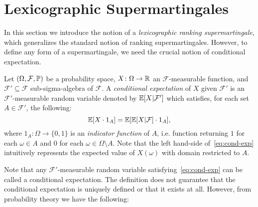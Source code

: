 \section{Lexicographic Supermartingales}
\label{sec:lexicographic}

In this section we introduce the notion of a \emph{lexicographic ranking 
supermartingale}, which generalizes the standard notion of ranking 
supermartingales. However, to define any form of a supermartingale, we need the crucial notion of conditional expectation.

\smallskip{} 
Let $(\Omega,\mathcal{F},\mathbb{P})$ be a probability space, 
$X\colon\Omega\rightarrow 
\mathbb{R}$ an $\mathcal{F}$-measurable function, and $\mathcal{F}'\subseteq 
\mathcal{F}$ sub-sigma-algebra of $\mathcal{F}$. A \emph{conditional 
	expectation} of $X$ given $\mathcal{F}'$ is an $\mathcal{F}'$-measurable random 
variable denoted by $\mathbb{E}[X| \mathcal{F}']$ which satisfies, for each set $A\in 
\mathcal{F}'$, the following: 
\begin{equation}
\label{eq:cond-exp}
\mathbb{E}[X\cdot 1_A] = \mathbb{E}[\mathbb{E}[X|\mathcal{F}]\cdot 1_A],
\end{equation}
where $1_A \colon \Omega\rightarrow \{0,1\}$ is an \emph{indicator function} of 
$A$, i.e. function returning $1$ for 
each $\omega\in A$ and $0$ for each $\omega\in \Omega\setminus A$. Note that 
the left hand-side of~\eqref{eq:cond-exp} intuitively represents the expected 
value 
of $X(\omega)$ with domain restricted to $A$.

Note that any $\mathcal{F}'$-measurable random variable satisfying~\eqref{eq:cond-exp} can be called a conditional expectation. The definition does not guarantee that the conditional expectation is uniquely defined or that it exists at all. However, from probability theory we have the following:

